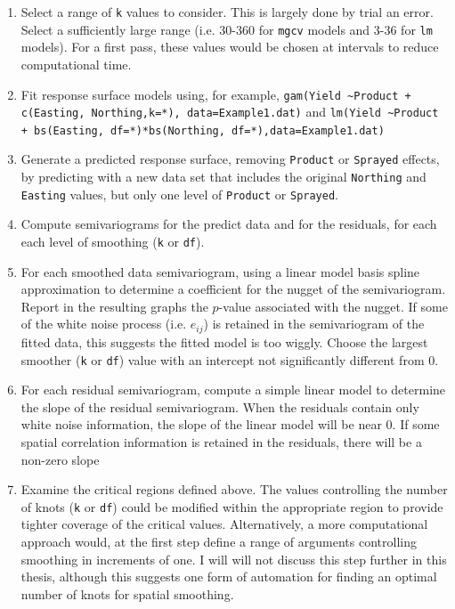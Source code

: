 \documentclass[phdcss]{SDSUThesis}
\begin{document}
\begin{enumerate}
  \item Select a range of \texttt{k} values to consider. This is largely done by trial an error. Select a sufficiently large range (i.e. 30-360 for \texttt{mgcv} models and 3-36 for \texttt{lm} models). For a first pass, these values would be chosen at intervals to reduce computational time.
  \item Fit response surface models using, for example, \texttt{gam(Yield \textasciitilde Product + c(Easting, Northing,k=*), data=Example1.dat)} and \texttt{lm(Yield \textasciitilde Product + bs(Easting, df=*)*bs(Northing, df=*),data=Example1.dat)}
  \item Generate a predicted response surface, removing \texttt{Product} or \texttt{Sprayed} effects, by predicting with a new data set that includes the original \texttt{Northing} and \texttt{Easting} values, but only one level of \texttt{Product} or \texttt{Sprayed}.
  \item Compute semivariograms for the predict data and for the residuals, for each each level of smoothing (\texttt{k} or \texttt{df}).
  \item For each smoothed data semivariogram, using a linear model basis spline approximation to determine a coefficient for the nugget of the semivariogram. Report in the resulting graphs the $p$-value associated with the nugget. If some of the white noise process (i.e. $e_{ij}$) is retained in the semivariogram of the fitted data, this suggests the fitted model is too wiggly. Choose the largest smoother (\texttt{k} or \texttt{df}) value with an intercept not significantly different from 0.
  \item For each residual semivariogram, compute a simple linear model to determine the slope of the residual semivariogram.  When the residuals contain only white noise information, the slope of the linear model will be near 0. If some spatial correlation information is retained in the residuals, there will be a non-zero slope
  \item Examine the critical regions defined above. The values controlling the number of knots (\texttt{k} or \texttt{df}) could be modified within the appropriate region to provide tighter coverage of the critical values. Alternatively, a more computational approach would, at the first step define a range of arguments controlling smoothing in increments of one. I will will not discuss this step further in this thesis, although this suggests one form of automation for finding an optimal number of knots for spatial smoothing.
\end{enumerate}
\end{document}
